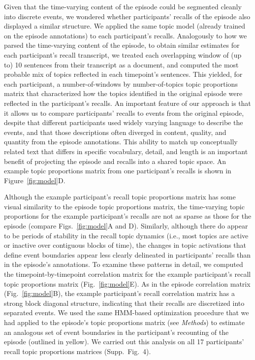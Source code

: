 \documentclass[10pt]{article}
\newcommand{\corrmats}{4}
\begin{document}
Given that the time-varying content of the episode could be segmented cleanly into discrete events, we wondered whether participants' recalls of the episode also displayed a similar structure.  We applied the same topic model (already trained on the episode annotations) to each participant's recalls.  Analogously to how we parsed the time-varying content of the episode, to obtain similar estimates for each participant's recall transcript, we treated each overlapping  window of (up to) 10 sentences from their transcript as a document, and computed the most probable mix of topics reflected in each timepoint's sentences.  This yielded, for each participant, a number-of-windows by number-of-topics topic proportions matrix that characterized how the topics identified in the original episode were reflected in the participant's recalls.  An important feature of our approach is that it allows us to compare participants' recalls to events from the original episode, despite that different participants used widely varying language to describe the events, and that those descriptions often diverged in content, quality, and quantity from the episode annotations.  This ability to match up conceptually related text that differs in specific vocabulary, detail, and length is an important benefit of projecting the episode and recalls into a shared topic space.  An example topic proportions matrix from one participant's recalls is shown in Figure~\ref{fig:model}D.

Although the example participant's recall topic proportions matrix has some visual similarity to the episode topic proportions matrix, the time-varying topic proportions for the example participant's recalls are not as sparse as those for the episode (compare Figs.~\ref{fig:model}A and D).  Similarly, although there do appear to be periods of stability in the recall topic dynamics (i.e., most topics are active or inactive over contiguous blocks of time), the changes in topic activations that define event boundaries appear less clearly delineated in participants' recalls than in the episode's annotations.  To examine these patterns in detail, we computed the timepoint-by-timepoint correlation matrix for the example participant's recall topic proportions matrix (Fig.~\ref{fig:model}E).  As in the episode correlation matrix (Fig.~\ref{fig:model}B), the example participant's recall correlation matrix has a strong block diagonal structure, indicating that their recalls are discretized into separated events.  We used the same HMM-based optimization procedure that we had applied to the episode's topic proportions matrix (see \textit{Methods}) to estimate an analogous set of event boundaries in the participant's recounting of the episode (outlined in yellow).  We carried out this analysis on all 17 participants' recall topic proportions matrices (Supp.\ Fig.~\corrmats).
\end{document}
